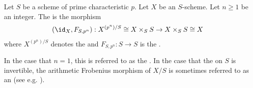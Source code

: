\begin{definition} \label{definition:arithmetic_frobenius_morphism_of_a_scheme_over_a_scheme_of_prime_characteristic}
    Let $S$ be a scheme of prime characteristic $p$. Let $X$ be an $S$-scheme. Let $n \geq 1$ be an integer. The  is the morphism 
    $$(\id_X, F_{S,p^n}): X^{(p^n)/S} \cong X \times_S S \to X \times_S S \cong X$$
    where $X^{(p^n)/S}$ denotes the  and $F_{S,p^n}: S \to S$ is the .  

    In the case that $n = 1$, this is referred to as the . In the case that the  on $S$ is invertible, the arithmetic Frobenius morphism of $X/S$ is sometimes referred to as an  (see e.g. \cite[Section I.1]{kiehl_weissauer_wcps}).
    
\end{definition}
